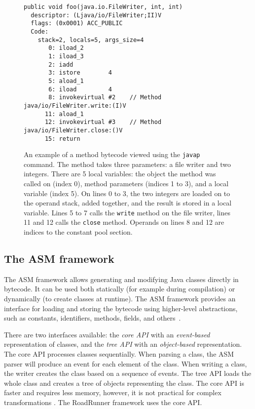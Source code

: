 \begin{figure}[hbt]
    \label{bytecodeExample}
    \begin{lstlisting}
public void foo(java.io.FileWriter, int, int)
  descriptor: (Ljava/io/FileWriter;II)V
  flags: (0x0001) ACC_PUBLIC
  Code:
    stack=2, locals=5, args_size=4
       0: iload_2
       1: iload_3
       2: iadd
       3: istore        4
       5: aload_1
       6: iload         4
       8: invokevirtual #2    // Method java/io/FileWriter.write:(I)V
      11: aload_1
      12: invokevirtual #3    // Method java/io/FileWriter.close:()V
      15: return
    \end{lstlisting}
    \caption{An example of a method bytecode viewed using the \texttt{javap}
    command. The method takes three parameters: a file writer and two integers.
    There are 5 local variables: the object the method was called on (index 0),
    method parameters (indices 1 to 3), and a local variable (index 5). On lines
    0 to 3, the two integers are loaded on to the operand stack, added together,
    and the result is stored in a local variable. Lines 5 to 7 calls the
    \texttt{write} method on the file writer, lines 11 and 12 calls the
    \texttt{close} method. Operands on lines 8 and 12 are indices to the
    constant pool section.}
\end{figure}


\subsection{The ASM framework}

The ASM framework allows generating and modifying Java classes directly in
bytecode. It can be used both statically (for example during compilation) or
dynamically (to create classes at runtime). The ASM framework provides an
interface for loading and storing the bytecode using higher-level abstractions,
such as constants, identifiers, methods, fields, and others~\cite{asmguide}.

There are two interfaces available: the \emph{core API} with an
\emph{event-based} representation of classes, and the \emph{tree API} with an
\emph{object-based} representation. The core API processes classes sequentially.
When parsing a class, the ASM parser will produce an event for each element of
the class.  When writing a class, the writer creates the class based on a
sequence of events. The tree API loads the whole class and creates a tree of
objects representing the class. The core API is faster and requires less memory,
however, it is not practical for complex transformations \cite{asmguide}. The
RoadRunner framework uses the core API.

